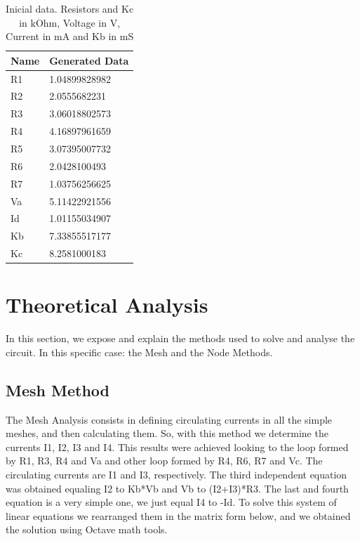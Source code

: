 \documentclass[11en, a4paper, oneside]{article}
\begin{document}
\begin{table}[ht]
\begin{center}
\begin{tabular}{|l|l|}
\hline
\textbf{Name} & \textbf{Generated Data} \\ \hline
R1        & 1.04899828982           \\ \hline
R2        & 2.0555682231            \\ \hline
R3        & 3.06018802573           \\ \hline
R4        & 4.16897961659           \\ \hline
R5        & 3.07395007732           \\ \hline
R6        & 2.0428100493            \\ \hline
R7        & 1.03756256625           \\ \hline
Va        & 5.11422921556           \\ \hline
Id        & 1.01155034907           \\ \hline
Kb        & 7.33855517177           \\ \hline
Kc        & 8.2581000183            \\ \hline
\end{tabular}
\caption{Inicial data. Resistors and Kc in kOhm, Voltage in V, Current in mA and Kb in mS}
\end{center}
\end{table}

\clearpage

\section{Theoretical Analysis}
\label{sec:analysis}

In this section, we expose and explain the methods used to solve and analyse the circuit. In this specific case: the Mesh and the Node Methods.

\subsection{Mesh Method}

The Mesh Analysis consists in defining circulating currents in all the simple meshes, and then calculating them. So, 
with this method we determine the currents I1, I2, I3 and I4. This results were achieved looking to the  loop formed by R1, R3, R4 and Va and other loop formed by R4, R6, R7 and Vc. The circulating currents are I1 and I3, respectively.  The third independent equation was obtained equaling I2 to Kb*Vb and Vb to (I2+I3)*R3. The last and fourth equation is a very simple one, we just equal I4 to -Id. To solve this system of linear equations we  rearranged them in the matrix form below, and we obtained the solution using Octave math tools.\\
\end{document}

